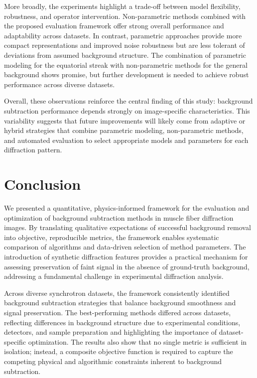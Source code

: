 \documentclass[iucr]{iucrjournals}
\begin{document}
More broadly, the experiments highlight a trade-off between model flexibility, robustness, and operator intervention. Non-parametric methods combined with the proposed evaluation framework offer strong overall performance and adaptability across datasets. In contrast, parametric approaches provide more compact representations and improved noise robustness but are less tolerant of deviations from assumed background structure. The combination of parametric modeling for the equatorial streak with non-parametric methods for the general background shows promise, but further development is needed to achieve robust performance across diverse datasets.

Overall, these observations reinforce the central finding of this study: background subtraction performance depends strongly on image-specific characteristics. This variability suggests that future improvements will likely come from adaptive or hybrid strategies that combine parametric modeling, non-parametric methods, and automated evaluation to select appropriate models and parameters for each diffraction pattern.


\section{Conclusion} 

We presented a quantitative, physics-informed framework for the evaluation and optimization of background subtraction methods in muscle fiber diffraction images. By translating qualitative expectations of successful background removal into objective, reproducible metrics, the framework enables systematic comparison of algorithms and data-driven selection of method parameters. The introduction of synthetic diffraction features provides a practical mechanism for assessing preservation of faint signal in the absence of ground-truth background, addressing a fundamental challenge in experimental diffraction analysis.

Across diverse synchrotron datasets, the framework consistently identified background subtraction strategies that balance background smoothness and signal preservation. The best-performing methods differed across datasets, reflecting differences in background structure due to experimental conditions, detectors, and sample preparation and highlighting the importance of dataset-specific optimization. The results also show that no single metric is sufficient in isolation; instead, a composite objective function is required to capture the competing physical and algorithmic constraints inherent to background subtraction.
\end{document}
